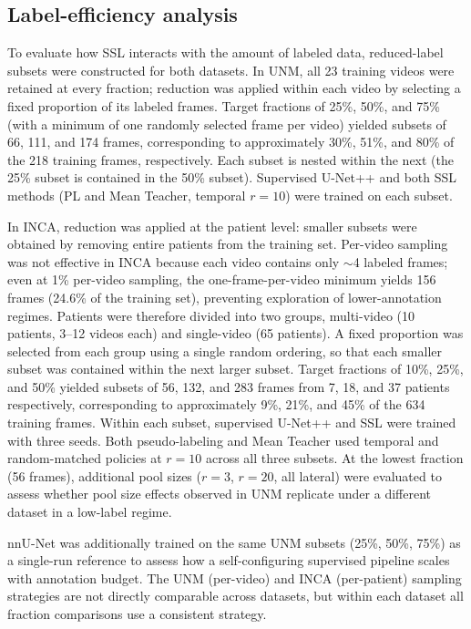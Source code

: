\documentclass[a4paper,fleqn]{cas-dc}
\begin{document}
\subsection{Label-efficiency analysis}
\label{sec:label-efficiency}

To evaluate how SSL interacts with the amount of labeled data, reduced-label subsets were constructed for both datasets.
In UNM, all 23 training videos were retained at every fraction; reduction was applied within each video by selecting a fixed proportion of its labeled frames. Target fractions of 25\%, 50\%, and 75\% (with a minimum of one randomly selected frame per video) yielded subsets of 66, 111, and 174 frames, corresponding to approximately 30\%, 51\%, and 80\% of the 218 training frames, respectively.
Each subset is nested within the next (the 25\% subset is contained in the 50\% subset).
Supervised U-Net++ and both SSL methods (PL and Mean Teacher, temporal $r{=}10$) were trained on each subset.

In INCA, reduction was applied at the patient level: smaller subsets were obtained by removing entire patients from the training set. Per-video sampling was not effective in INCA because each video contains only ${\sim}$4 labeled frames; even at 1\% per-video sampling, the one-frame-per-video minimum yields 156 frames (24.6\% of the training set), preventing exploration of lower-annotation regimes.
Patients were therefore divided into two groups, multi-video (10 patients, 3--12 videos each) and single-video (65 patients). A fixed proportion was selected from each group using a single random ordering, so that each smaller subset was contained within the next larger subset.
Target fractions of 10\%, 25\%, and 50\% yielded subsets of 56, 132, and 283 frames from 7, 18, and 37 patients respectively, corresponding to approximately 9\%, 21\%, and 45\% of the 634 training frames.
Within each subset, supervised U-Net++ and SSL were trained with three seeds. Both pseudo-labeling and Mean Teacher used temporal and random-matched policies at $r{=}10$ across all three subsets.
At the lowest fraction (56 frames), additional pool sizes ($r{=}3$, $r{=}20$, all lateral) were evaluated to assess whether pool size effects observed in UNM replicate under a different dataset in a low-label regime.

nnU-Net was additionally trained on the same UNM subsets (25\%, 50\%, 75\%) as a single-run reference to assess how a self-configuring supervised pipeline scales with annotation budget. The UNM (per-video) and INCA (per-patient) sampling strategies are not directly comparable across datasets, but within each dataset all fraction comparisons use a consistent strategy.
\end{document}
